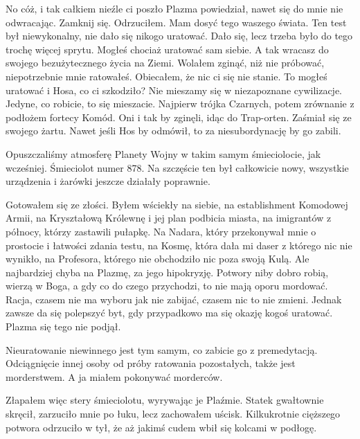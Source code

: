 \begin{dialogue}
\ds{} No cóż, i tak całkiem nieźle ci poszło \dm{} Plazma powiedział, nawet się do mnie nie odwracając. 
\ds{} Zamknij się. \dm{} Odrzuciłem. \dm{} Mam dosyć tego waszego świata. Ten test był niewykonalny, nie dało się nikogo uratować.
\ds{} Dało się, lecz trzeba było do tego trochę więcej sprytu. Mogłeś chociaż uratować sam siebie. A tak wracasz do swojego bezużytecznego życia na Ziemi.
\ds{} Wolałem zginąć, niż nie próbować, niepotrzebnie mnie ratowałeś.
\ds{} Obiecałem, że nic ci się nie stanie.
\ds{} To mogłeś uratować i Hosa, co ci szkodziło?
\ds{} Nie mieszamy się w niezapoznane cywilizacje.
\ds{} Jedyne, co robicie, to się mieszacie. Najpierw trójka Czarnych, potem zrównanie z podłożem fortecy Komód.
\ds{} Oni i tak by zginęli, idąc do Trap-orten. \dm{} Zaśmiał się ze swojego żartu. \dm{} Nawet jeśli Hos by odmówił, to za niesubordynację by go zabili.
\end{dialogue}

Opuszczaliśmy atmosferę Planety Wojny w takim samym śmieciolocie, jak wcześniej. Śmieciolot numer 878.
Na szczęście ten był całkowicie nowy, wszystkie urządzenia i żarówki jeszcze działały poprawnie.

Gotowałem się ze złości. Byłem wściekły na siebie, na establishment Komodowej Armii, na Kryształową Królewnę i jej plan podbicia miasta, na imigrantów z północy, którzy zastawili pułapkę.
Na Nadara, który przekonywał mnie o prostocie i łatwości zdania testu, na Kosmę, która dała mi daser z którego nic nie wynikło, na Profesora, którego nie obchodziło nic poza swoją Kulą.
Ale najbardziej chyba na Plazmę, za jego hipokryzję. 
Potwory niby dobro robią, wierzą w Boga, a gdy co do czego przychodzi, to nie mają oporu mordować.
Racja, czasem nie ma wyboru jak nie zabijać, czasem nic to nie zmieni. Jednak zawsze da się polepszyć byt, gdy przypadkowo ma się okazję kogoś uratować.
Plazma się tego nie podjął. 

Nieuratowanie niewinnego jest tym samym, co zabicie go z premedytacją.
Odciągnięcie innej osoby od próby ratowania pozostałych, także jest morderstwem.
A ja miałem pokonywać morderców.

Złapałem więc stery śmieciolotu, wyrywając je Plaźmie.
Statek gwałtownie skręcił, zarzuciło mnie po łuku, lecz zachowałem uścisk.
Kilkukrotnie cięższego potwora odrzuciło w tył, że aż jakimś cudem wbił się kolcami w podłogę.

